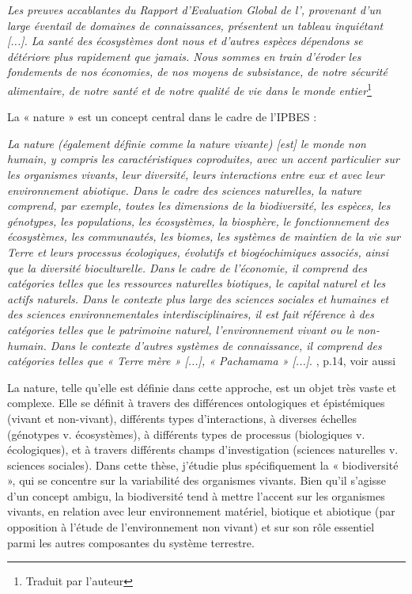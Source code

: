 \begin{displayquote}
\textit{Les preuves accablantes du Rapport d'Evaluation Global de l'\cite{ipbes_2022_6417333}, provenant d'un large éventail de domaines de connaissances, présentent un tableau inquiétant [...]. La santé des écosystèmes dont nous et d'autres espèces dépendons se détériore plus rapidement que jamais. Nous sommes en train d'éroder les fondements de nos économies, de nos moyens de subsistance, de notre sécurité alimentaire, de notre santé et de notre qualité de vie dans le monde entier}\footnote{Traduit par l'auteur}
\end{displayquote}

La « nature » est un concept central dans le cadre de l'IPBES \citep{ipbes_2022_6417333} :

\begin{displayquote} 
\textit{La nature (également définie comme la nature vivante) [est] le monde non humain, y compris les caractéristiques coproduites, avec un accent particulier sur les organismes vivants, leur diversité, leurs interactions entre eux et avec leur environnement abiotique. Dans le cadre des sciences naturelles, la nature comprend, par exemple, toutes les dimensions de la biodiversité, les espèces, les génotypes, les populations, les écosystèmes, la biosphère, le fonctionnement des écosystèmes, les communautés, les biomes, les systèmes de maintien de la vie sur Terre et leurs processus écologiques, évolutifs et biogéochimiques associés, ainsi que la diversité bioculturelle. Dans le cadre de l'économie, il comprend des catégories telles que les ressources naturelles biotiques, le capital naturel et les actifs naturels. Dans le contexte plus large des sciences sociales et humaines et des sciences environnementales interdisciplinaires, il est fait référence à des catégories telles que le patrimoine naturel, l'environnement vivant ou le non-humain. Dans le contexte d'autres systèmes de connaissance, il comprend des catégories telles que « Terre mère » [...], « Pachamama » [...]}.
\hspace*{\fill} \small{ \cite{ipbes_2022_6417333}, p.14, voir aussi \cite{DIAZ20151} }
\end{displayquote}

La nature, telle qu'elle est définie dans cette approche, est un objet très vaste et complexe. Elle se définit à travers des différences ontologiques et épistémiques (vivant et non-vivant), différents types d'interactions, à diverses échelles (génotypes v. écosystèmes), à différents types de processus (biologiques v. écologiques), et à travers différents champs d'investigation (sciences naturelles v. sciences sociales). Dans cette thèse, j'étudie plus spécifiquement la « biodiversité », qui se concentre sur la variabilité des organismes vivants. Bien qu'il s'agisse d'un concept ambigu, la biodiversité tend à mettre l'accent sur les organismes vivants, en relation avec leur environnement matériel, biotique et abiotique (par opposition à l'étude de l'environnement non vivant) et sur son rôle essentiel parmi les autres composantes du système terrestre.

